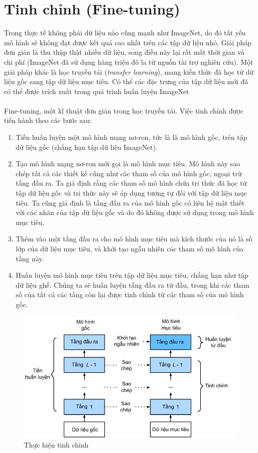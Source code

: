 \documentclass{article}
\begin{document}
\section{Tinh chỉnh (Fine-tuning)}
Trong thực tế không phải dữ liệu nào cũng mạnh như ImageNet, do đó tất yếu mô hình sẽ không đạt được kết quả cao nhất trên các tập dữ liệu nhỏ. Giải pháp đơn giản là thu thập thật nhiều dữ liệu, song điều này lại rất mất thời gian và chi phí (ImageNet đã sử dụng hàng triệu đô la từ nguồn tài trợ nghiên cứu). Một giải pháp khác là học truyền tải (\textit{transfer learning}), mang kiến thức đã học từ dữ liệu gốc sang tập dữ liệu mục tiêu. Có thể các đặc trưng của tập dữ liệu mới đã có thể được trích xuất trong quá trình huấn luyện ImageNet\\\\
Fine-tuning, một kĩ thuật đơn giản trong học truyền tải. Việc tinh chỉnh được tiến hành theo các bước sau:
\begin{enumerate}
    \item Tiền huấn luyện một mô hình mạng nơ-ron, tức là là mô hình gốc, trên tập dữ liệu gốc (chẳng hạn tập dữ liệu ImageNet).
    \item Tạo mô hình mạng nơ-ron mới gọi là mô hình mục tiêu. Mô hình này sao chép tất cả các thiết kế cũng như các tham số của mô hình gốc, ngoại trừ tầng đầu ra. Ta giả định rằng các tham số mô hình chứa tri thức đã học từ tập dữ liệu gốc và tri thức này sẽ áp dụng tương tự đối với tập dữ liệu mục tiêu. Ta cũng giả định là tầng đầu ra của mô hình gốc có liên hệ mật thiết với các nhãn của tập dữ liệu gốc và do đó không được sử dụng trong mô hình mục tiêu.
    \item Thêm vào một tầng đầu ra cho mô hình mục tiêu mà kích thước của nó là số lớp của dữ liệu mục tiêu, và khởi tạo ngẫu nhiên các tham số mô hình của tầng này.
    \item Huấn luyện mô hình mục tiêu trên tập dữ liệu mục tiêu, chẳng hạn như tập dữ liệu ghế. Chúng ta sẽ huấn luyện tầng đầu ra từ đầu, trong khi các tham số của tất cả các tầng còn lại được tinh chỉnh từ các tham số của mô hình gốc.
\end{enumerate}
\begin{figure}
    \centering
    \includegraphics[width = 0.7\linewidth]{finetune.pdf}
    \caption{Thực hiện tinh chỉnh}
    \label{fig25}
\end{figure}
\end{document}
